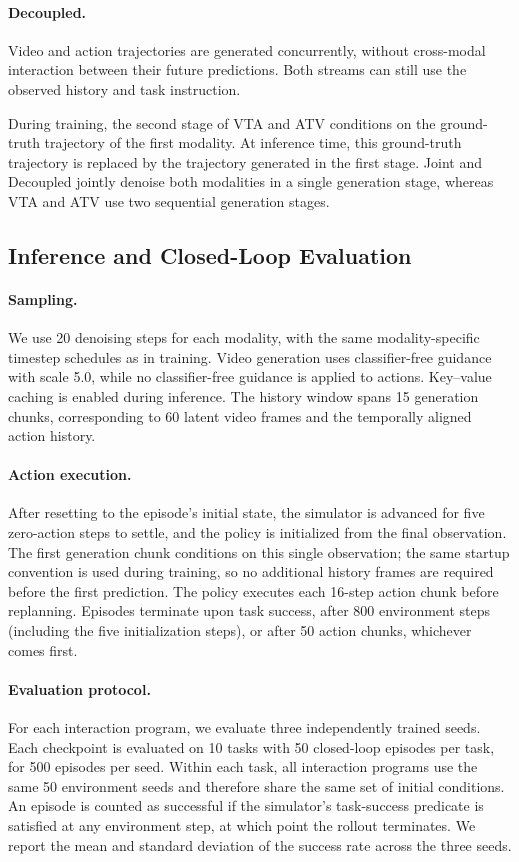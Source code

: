 \paragraph{Decoupled.}
Video and action trajectories are generated concurrently, without
cross-modal interaction between their future predictions. Both
streams can still use the observed history and task instruction.

During training, the second stage of VTA and ATV conditions on the ground-truth trajectory of the first modality. 
At inference time, this ground-truth trajectory is replaced by the trajectory generated in the first stage. 
Joint and Decoupled jointly denoise both modalities in a single generation stage, whereas VTA and ATV use two sequential generation stages.

\subsection{Inference and Closed-Loop Evaluation}
\label{sec:supp-evaluation}

\paragraph{Sampling.}
We use 20 denoising steps for each modality, with the same
modality-specific timestep schedules as in training. Video generation
uses classifier-free guidance with scale 5.0, while no classifier-free
guidance is applied to actions. Key--value caching is enabled during
inference. The history window spans 15 generation chunks, corresponding
to 60 latent video frames and the temporally aligned action history.

\paragraph{Action execution.}
After resetting to the episode's initial state, the simulator is advanced for
five zero-action steps to settle, and the policy is initialized from the final
observation. The first generation chunk conditions on this single observation;
the same startup convention is used during training, so no additional history
frames are required before the first prediction. The policy executes each
16-step action chunk before replanning. Episodes terminate upon task success,
after 800 environment steps (including the five initialization steps), or after
50 action chunks, whichever comes first.

\paragraph{Evaluation protocol.}
For each interaction program, we evaluate three independently trained
seeds. Each checkpoint is evaluated on 10 tasks with 50 closed-loop
episodes per task, for 500 episodes per seed. Within each task, all
interaction programs use the same 50 environment seeds and therefore
share the same set of initial conditions. An episode is counted as
successful if the simulator's task-success predicate is satisfied at
any environment step, at which point the rollout terminates. We report
the mean and standard deviation of the success rate across the three seeds.

